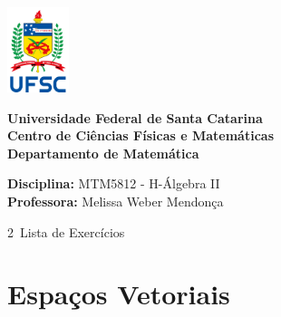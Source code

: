 \documentclass[12pt]{article}
\begin{document}
\ \vspace{-1.4cm}
\begin{tcolorbox}[colback=black!0]
    \noindent
    \begin{minipage}{0.14\linewidth}
        \hspace*{-0.2cm}\includegraphics[height = 2.5cm]{UFSC.png}
    \end{minipage}
	\noindent
	\begin{minipage}{0.79\linewidth}
	    \begin{center}
	        \vspace*{0.2cm}
	        {\bf \large Universidade Federal de Santa Catarina} \\ \vspace{0.3cm}
			{\bf \large Centro de Ciências Físicas e Matemáticas} \\ \vspace{0.3cm}
			{\bf \large Departamento de Matemática}
		\end{center}
	\end{minipage}
\end{tcolorbox}

\noindent\textbf{Disciplina:} MTM5812 - H-Álgebra II\\
\textbf{Professora:} Melissa Weber Mendonça

\begin{center}
    \Large{2\textordfeminine\ Lista de Exercícios}
\end{center}

\section{Espaços Vetoriais}
\end{document}
